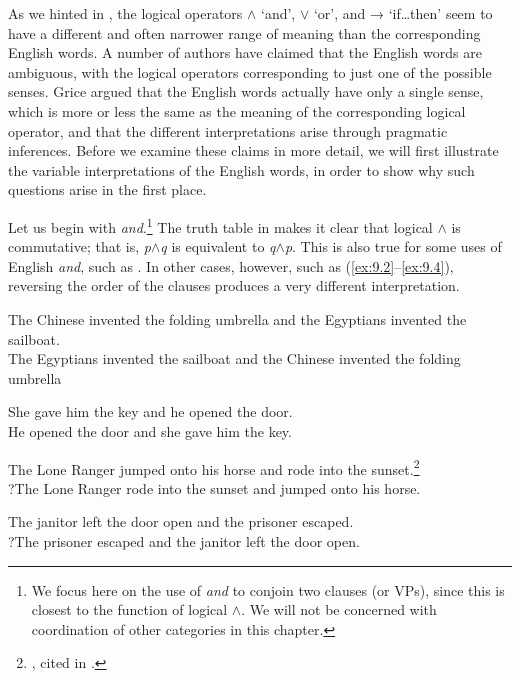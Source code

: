 As we hinted in , the logical operators $\wedge$ ‘and’, $\vee$ ‘or’, and → ‘if…then’ seem to have a different and often narrower range of meaning than the corresponding English words. A number of authors have claimed that the English words are ambiguous, with the logical operators corresponding to just one of the possible senses. Grice argued that the English words actually have only a single sense, which is more or less the same as the meaning of the corresponding logical operator, and that the different interpretations arise through pragmatic inferences. Before we examine these claims in more detail, we will first illustrate the variable interpretations of the English words, in order to show why such questions arise in the first place.



Let us begin with \textit{and}.\footnote{We focus here on the use of \textit{and} to conjoin two clauses (or VPs), since this is closest to the function of logical $\wedge$. We will not be concerned with coordination of other categories in this chapter.} The truth table in  makes it clear that logical $\wedge$ is commutative; that is, \textit{p$\wedge$}\textit{q} is equivalent to \textit{q$\wedge$}\textit{p}. This is also true for some uses of English \textit{and}, such as . In other cases, however, such as (\ref{ex:9.2}--\ref{ex:9.4}), reversing the order of the clauses produces a very different interpretation.


\ea \label{ex:9.1}
\ea The Chinese invented the folding umbrella and the Egyptians invented the sailboat.\\
\ex The Egyptians invented the sailboat and the Chinese invented the folding umbrella
                       \z
\z

\ea \label{ex:9.2}
\ea She gave him the key and he opened the door.\\
\ex He opened the door and she gave him the key.
                       \z
\z

\ea \label{ex:9.3}
\ea The Lone Ranger jumped onto his horse and rode into the sunset.\footnote{\citet[56]{Kempson1975}, cited in \citet{Gazdar1979}.}\\
\ex ?The Lone Ranger rode into the sunset and jumped onto his horse.
                       \z
\z

\ea \label{ex:9.4}
\ea The janitor left the door open and the prisoner escaped.\\
\ex ?The prisoner escaped and the janitor left the door open.
                       \z
\z


